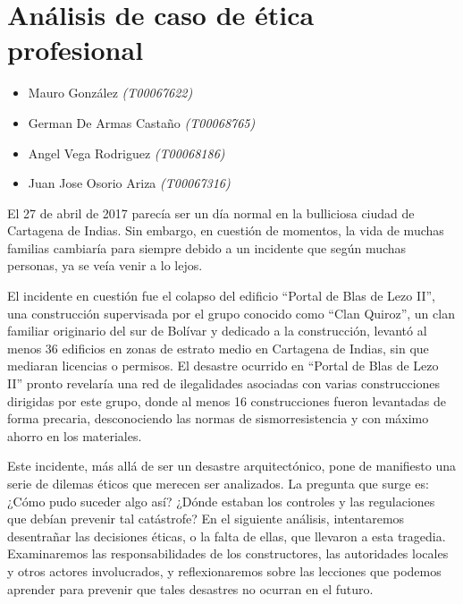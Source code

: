\documentclass[letterpaper, 12pt]{article}
\begin{document}
\section*{Análisis de caso de ética profesional}

\noindent\makebox[\linewidth]{\rule{\textwidth}{0.4pt}}

\begin{itemize}[label=$\triangleright$]
      \item Mauro González \textit{(T00067622)}
      \item German De Armas Castaño \textit{(T00068765)}
      \item Angel Vega Rodriguez \textit{(T00068186)}
      \item Juan Jose Osorio Ariza \textit{(T00067316)}
\end{itemize}

\noindent\makebox[\linewidth]{\rule{\textwidth}{0.4pt}}

\nocite{Batista_2022}
\nocite{Hoyos_2023}
\nocite{LilianaCarmen}
\nocite{vera2019revision}


El 27 de abril de 2017 parecía ser un día normal en la
bulliciosa ciudad de Cartagena de Indias. Sin embargo, en
cuestión de momentos, la vida de muchas familias cambiaría
para siempre debido a un incidente que según muchas
personas, ya se veía venir a lo lejos.

El incidente en cuestión fue el colapso del edificio
``Portal de Blas de Lezo II'', una construcción supervisada
por el grupo conocido como ``Clan Quiroz'', un clan
familiar originario del sur de Bolívar y dedicado a la
construcción, levantó al menos 36 edificios en zonas de
estrato medio en Cartagena de Indias, sin que mediaran
licencias o permisos. El desastre ocurrido en ``Portal de
Blas de Lezo II'' pronto revelaría una red de ilegalidades
asociadas con varias construcciones dirigidas por este
grupo, donde al menos 16 construcciones fueron levantadas
de forma precaria, desconociendo las normas de
sismorresistencia y con máximo ahorro en los materiales.

Este incidente, más allá de ser un desastre arquitectónico,
pone de manifiesto una serie de dilemas éticos que merecen
ser analizados. La pregunta que surge es: ¿Cómo pudo
suceder algo así? ¿Dónde estaban los controles y las
regulaciones que debían prevenir tal catástrofe? En el
siguiente análisis, intentaremos desentrañar las decisiones
éticas, o la falta de ellas, que llevaron a esta tragedia.
Examinaremos las responsabilidades de los constructores,
las autoridades locales y otros actores involucrados, y
reflexionaremos sobre las lecciones que podemos aprender
para prevenir que tales desastres no ocurran en el futuro.
\end{document}
